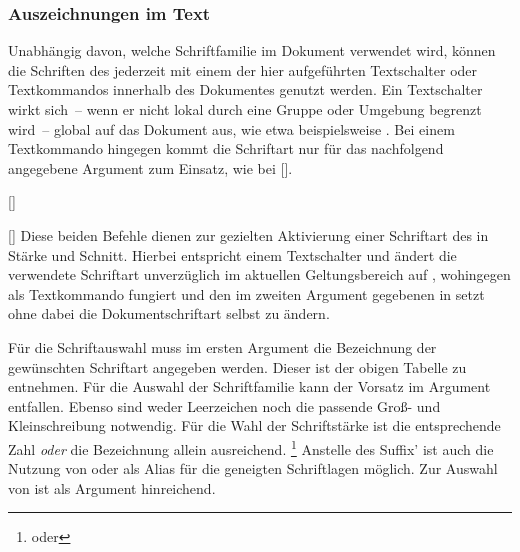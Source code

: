 \begin{Declaration*}{}
\begin{Declaration*}{}
\begin{Declaration*}{}
\subsubsection{Auszeichnungen im Text}
%
%
%
Unabhängig davon, welche Schriftfamilie im Dokument verwendet wird, können die 
Schriften des \CDs jederzeit mit einem der hier aufgeführten Textschalter oder 
Textkommandos innerhalb des Dokumentes genutzt werden. Ein Textschalter wirkt 
sich~-- wenn er nicht lokal durch eine Gruppe oder Umgebung begrenzt wird~-- 
global auf das Dokument aus, wie etwa beispielsweise . Bei 
einem Textkommando hingegen kommt die Schriftart nur für das nachfolgend 
angegebene Argument zum Einsatz, wie bei []. 
%
\begin{Declaration}[v2.04]{[]}
\begin{Declaration}[v2.04]{%
  []%
}
\printdeclarationlist
Diese beiden Befehle dienen zur gezielten Aktivierung einer Schriftart des \CDs 
in Stärke und Schnitt. Hierbei entspricht  einem Textschalter und 
ändert die verwendete Schriftart unverzüglich im aktuellen Geltungsbereich auf 
, wohingegen  als Textkommando fungiert und 
den im zweiten Argument gegebenen  in  setzt ohne 
dabei die Dokumentschriftart selbst zu ändern.

Für die Schriftauswahl muss im ersten Argument die Bezeichnung der gewünschten 
Schriftart angegeben werden. Dieser ist der obigen Tabelle zu entnehmen. Für 
die Auswahl der Schriftfamilie \Univers kann der Vorsatz  im 
Argument  entfallen. Ebenso sind weder Leerzeichen noch die 
passende Groß- und Kleinschreibung notwendig. Für die Wahl der Schriftstärke 
ist die entsprechende Zahl \emph{oder} die Bezeichnung allein ausreichend.%
\footnote{ oder }
Anstelle des Suffix'  ist auch die Nutzung von  
oder  als Alias für die geneigten Schriftlagen möglich. Zur 
Auswahl von \DIN ist  als Argument hinreichend.
\end{Declaration}
\end{Declaration}


\end{Declaration*}
\end{Declaration*}
\end{Declaration*}
